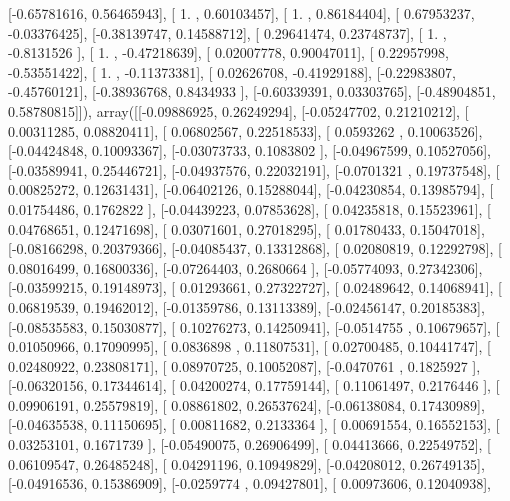 \documentclass{article}
\begin{document}
       [-0.65781616,  0.56465943],
       [ 1.        ,  0.60103457],
       [ 1.        ,  0.86184404],
       [ 0.67953237, -0.03376425],
       [-0.38139747,  0.14588712],
       [ 0.29641474,  0.23748737],
       [ 1.        , -0.8131526 ],
       [ 1.        , -0.47218639],
       [ 0.02007778,  0.90047011],
       [ 0.22957998, -0.53551422],
       [ 1.        , -0.11373381],
       [ 0.02626708, -0.41929188],
       [-0.22983807, -0.45760121],
       [-0.38936768,  0.8434933 ],
       [-0.60339391,  0.03303765],
       [-0.48904851,  0.58780815]]), array([[-0.09886925,  0.26249294],
       [-0.05247702,  0.21210212],
       [ 0.00311285,  0.08820411],
       [ 0.06802567,  0.22518533],
       [ 0.0593262 ,  0.10063526],
       [-0.04424848,  0.10093367],
       [-0.03073733,  0.1083802 ],
       [-0.04967599,  0.10527056],
       [-0.03589941,  0.25446721],
       [-0.04937576,  0.22032191],
       [-0.0701321 ,  0.19737548],
       [ 0.00825272,  0.12631431],
       [-0.06402126,  0.15288044],
       [-0.04230854,  0.13985794],
       [ 0.01754486,  0.1762822 ],
       [-0.04439223,  0.07853628],
       [ 0.04235818,  0.15523961],
       [ 0.04768651,  0.12471698],
       [ 0.03071601,  0.27018295],
       [ 0.01780433,  0.15047018],
       [-0.08166298,  0.20379366],
       [-0.04085437,  0.13312868],
       [ 0.02080819,  0.12292798],
       [ 0.08016499,  0.16800336],
       [-0.07264403,  0.2680664 ],
       [-0.05774093,  0.27342306],
       [-0.03599215,  0.19148973],
       [ 0.01293661,  0.27322727],
       [ 0.02489642,  0.14068941],
       [ 0.06819539,  0.19462012],
       [-0.01359786,  0.13113389],
       [-0.02456147,  0.20185383],
       [-0.08535583,  0.15030877],
       [ 0.10276273,  0.14250941],
       [-0.0514755 ,  0.10679657],
       [ 0.01050966,  0.17090995],
       [ 0.0836898 ,  0.11807531],
       [ 0.02700485,  0.10441747],
       [ 0.02480922,  0.23808171],
       [ 0.08970725,  0.10052087],
       [-0.0470761 ,  0.1825927 ],
       [-0.06320156,  0.17344614],
       [ 0.04200274,  0.17759144],
       [ 0.11061497,  0.2176446 ],
       [ 0.09906191,  0.25579819],
       [ 0.08861802,  0.26537624],
       [-0.06138084,  0.17430989],
       [-0.04635538,  0.11150695],
       [ 0.00811682,  0.2133364 ],
       [ 0.00691554,  0.16552153],
       [ 0.03253101,  0.1671739 ],
       [-0.05490075,  0.26906499],
       [ 0.04413666,  0.22549752],
       [ 0.06109547,  0.26485248],
       [ 0.04291196,  0.10949829],
       [-0.04208012,  0.26749135],
       [-0.04916536,  0.15386909],
       [-0.0259774 ,  0.09427801],
       [ 0.00973606,  0.12040938],
\end{document}
